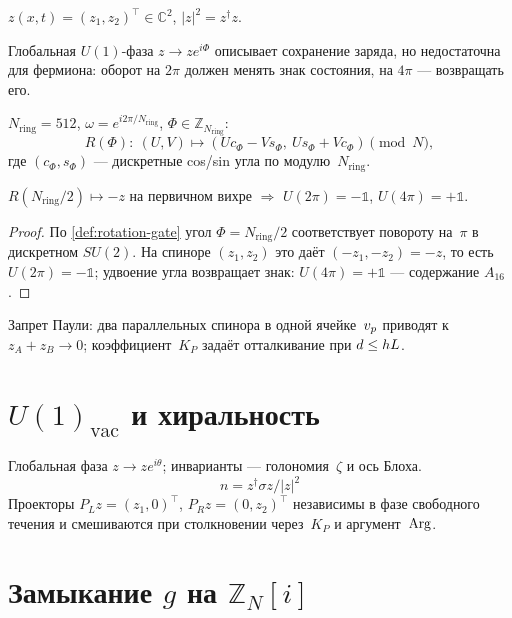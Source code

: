 \begin{definition}
$z(x,t)=(z_1,z_2)^\top\in\mathbb{C}^2$, $|z|^2=z^\dagger z$.
\end{definition}

Глобальная $U(1)$-фаза $z\to z e^{i\Phi}$ описывает сохранение заряда,
но недостаточна для фермиона: оборот на $2\pi$ должен менять знак состояния,
на $4\pi$ --- возвращать его.

\begin{definition}
\label{def:rotation-gate}
$N_{\mathrm{ring}}=512$, $\omega=e^{i2\pi/N_{\mathrm{ring}}}$, $\Phi\in\mathbb{Z}_{N_{\mathrm{ring}}}$:
\[
  R(\Phi):\ (U,V)\mapsto (U c_\Phi - V s_\Phi,\ U s_\Phi + V c_\Phi)\pmod N,
\]
где $(c_\Phi,s_\Phi)$ --- дискретные cos/sin угла по модулю~$N_{\mathrm{ring}}$.
\end{definition}

\begin{corollary}[Спин $1/2$]
$R(N_{\mathrm{ring}}/2)\mapsto -z$ на первичном вихре $\Rightarrow$
$U(2\pi)=-\mathbb{1}$, $U(4\pi)=+\mathbb{1}$.
\end{corollary}

\begin{proof}
По \cref{def:rotation-gate} угол $\Phi=N_{\mathrm{ring}}/2$ соответствует повороту на~$\pi$
в дискретном $SU(2)$.
На спиноре $(z_1,z_2)$ это даёт $(-z_1,-z_2)=-z$, то есть $U(2\pi)=-\mathbb{1}$;
удвоение угла возвращает знак: $U(4\pi)=+\mathbb{1}$ --- содержание $A_{16}$.
\end{proof}

Запрет Паули: два параллельных спинора в одной ячейке~$v_p$
приводят к $z_A+z_B\to 0$; коэффициент~$K_P$ задаёт отталкивание при $d\le hL$.

\section{$U(1)_{\mathrm{vac}}$ и хиральность}

Глобальная фаза $z\to z e^{i\theta}$; инварианты --- голономия~$\zeta$
и ось Блоха.
\[
n=z^\dagger\sigma z/|z|^2
\]
Проекторы $P_L z=(z_1,0)^\top$, $P_R z=(0,z_2)^\top$
независимы в фазе свободного течения и смешиваются при столкновении
через~$K_P$ и аргумент~$\operatorname{Arg}$.

\section{Замыкание \texorpdfstring{$g$}{g} на \texorpdfstring{$\mathbb{Z}_N[i]$}{Z\_N[i]}}
\label{sec:g-law}

